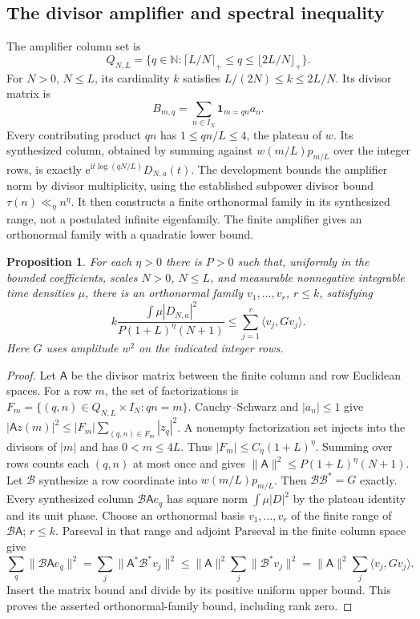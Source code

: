 \documentclass[11pt,a4paper,oneside]{article}
\newtheorem{proposition}[theorem]{Proposition}
\theoremstyle{definition}
\newcommand{\N}{\mathbb N}
\newcommand{\ii}{\mathrm i}
\newcommand{\e}{\mathrm e}
\newcommand{\one}{\mathbf 1}
\numberwithin{equation}{section}
\begin{document}
\subsection{The divisor amplifier and spectral inequality}
The amplifier column set is
\[
 Q_{N,L}=\{q\in\N:\lceil L/N\rceil_+\le q\le\lfloor2L/N\rfloor_+\}.
\]
For $N>0$, $N\le L$, its cardinality $k$ satisfies
$L/(2N)\le k\le2L/N$. Its divisor matrix is
\[
 B_{m,q}=\sum_{n\in I_N}\one_{m=qn}a_n.
\]
Every contributing product $qn$ has $1\le qn/L\le4$, the plateau of $w$.
Its synthesized column, obtained by summing against $w(m/L)p_{m/L}$ over the integer rows, is exactly
$\e^{\ii t\log(qN/L)}D_{N,a}(t)$.
The development bounds the amplifier norm by divisor multiplicity, using the
established subpower divisor bound $\tau(n)\ll_\eta n^\eta$.
It then constructs a finite orthonormal family in its synthesized range,
not a postulated infinite eigenfamily.
The finite amplifier gives an orthonormal family with a quadratic lower bound.
\begin{proposition}\label{input:amp}
For each $\eta>0$ there is $P>0$ such that, uniformly in the bounded
coefficients, scales $N>0$, $N\le L$, and measurable nonnegative integrable time densities $\mu$,
there is an orthonormal family $v_1,\ldots,v_r$, $r\le k$, satisfying
\[
 k\frac{\int\mu|D_{N,a}|^2}{P(1+L)^\eta(N+1)}
 \le\sum_{j=1}^r\langle v_j,Gv_j\rangle.
\]
Here $G$ uses amplitude $w^2$ on the indicated integer rows.

\end{proposition}
\begin{proof}
Let $\mathsf A$ be the divisor matrix between the finite column
and row Euclidean spaces. For a row $m$, the set of factorizations is
$F_m=\{(q,n)\in Q_{N,L}\times I_N:qn=m\}$.
Cauchy--Schwarz and $|a_n|\le1$ give
$|\mathsf A z(m)|^2\le|F_m|\sum_{(q,n)\in F_m}|z_q|^2$.
A nonempty factorization set injects into the divisors of $|m|$ and has $0<m\le4L$.
Thus $|F_m|\le C_\eta(1+L)^\eta$. Summing over rows counts each $(q,n)$
at most once and gives
$\|\mathsf A\|^2\le P(1+L)^\eta(N+1)$.
Let $\mathcal B$ synthesize a row coordinate into $w(m/L)p_{m/L}$.
Then $\mathcal B\mathcal B^*=G$ exactly. Every synthesized column
$\mathcal B\mathsf A e_q$ has square norm $\int\mu|D|^2$ by the
plateau identity and its unit phase.
Choose an orthonormal basis $v_1,\ldots,v_r$ of the finite range of
$\mathcal B\mathsf A$; $r\le k$. Parseval in that range and adjoint
Parseval in the finite column space give
\[
 \sum_q\|\mathcal B\mathsf A e_q\|^2
 =\sum_j\|\mathsf A^*\mathcal B^*v_j\|^2
 \le\|\mathsf A\|^2\sum_j\|\mathcal B^*v_j\|^2
 =\|\mathsf A\|^2\sum_j\langle v_j,Gv_j\rangle.
\]
Insert the matrix bound and divide by its positive uniform upper bound.
This proves the asserted orthonormal-family bound, including rank zero.
\end{proof}
\end{document}
